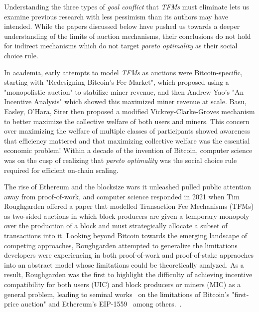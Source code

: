 
Understanding the three types of \textit{goal conflict} that \textit{TFMs} must eliminate lets us examine previous research with less pessimism than its authors may have intended. While the papers discussed below have pushed us towards a deeper understanding of the limits of auction mechanisms, their conclusions do not hold for indirect mechanisms which do not target \textit{pareto optimality} as their social choice rule.

In academia, early attempts to model \textit{TFMs} as auctions were Bitcoin-specific, starting with "Redesigning Bitcoin's Fee Market", which proposed using a "monopolistic auction" to stabilize miner revenue, and then Andrew Yao's "An Incentive Analysis" which showed this maximized miner revenue at scale. Basu, Easley, O’Hara, Sirer then proposed a modified Vickrey-Clarke-Groves mechanism to better maximize the collective welfare of both users and miners. This concern over maximizing the welfare of multiple classes of participants showed awareness that efficiency mattered and that maximizing collective welfare was the essential economic problem! Within a decade of the invention of Bitcoin, computer science was on the cusp of realizing that \textit{pareto optimality} was the social choice rule required for efficient on-chain scaling.

The rise of Ethereum and the blocksize wars it unleashed pulled public attention away from proof-of-work, and computer science responded in 2021 when Tim Roughgarden\citet{roughgarden2021,roughgarden2024transaction} offered a paper that modelled Transaction Fee Mechanisms (TFMs) as two-sided auctions in which block producers are given a temporary monopoly over the production of a block and must strategically allocate a subset of transactions into it. Looking beyond Bitcoin towards the emerging landscape of competing approaches, Roughgarden attempted to generalize the limitations developers were experiencing in both proof-of-work and proof-of-stake appraoches into an abstract model whose limitations could be theoretically analyzed. As a result, Roughgarden was the first to highlight the difficulty of achieving incentive compatibility for both users (UIC) and block producers or miners (MIC) as a general problem, leading to seminal works~\cite {roughgarden2021,roughgarden2024transaction} on the limitations of Bitcoin's "first-price auction" and Ethereum's EIP-1559~\cite{buterin2019eip} among others.~\cite{roughgarden2021,roughgarden2024transaction}.

